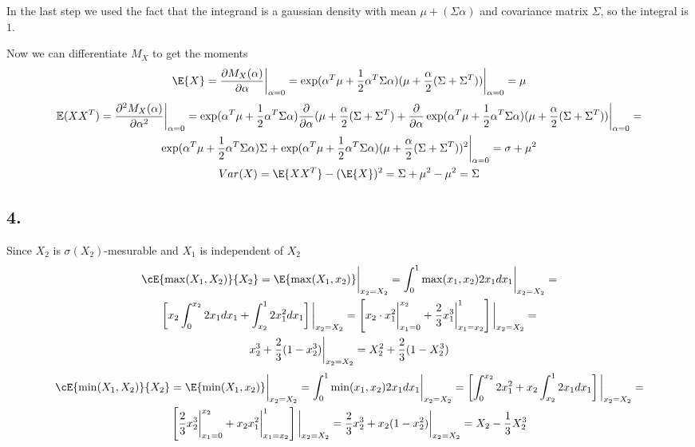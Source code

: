 In the last step we used the fact that the integrand is a gaussian density with mean $\mu+(\Sigma\alpha)$ and covariance matrix $\Sigma$, so the integral is $1$.

Now we can differentiate $M_X$ to get the moments
\begin{gather*}
    \E{X}=\frac{\partial M_X(\alpha)}{\partial \alpha}\bigg \lvert_{\alpha=0} = \exp( \alpha^T\mu +\frac{1}{2}\alpha^T\Sigma\alpha)(\mu+\frac{\alpha}{2}(\Sigma+\Sigma^T))\bigg\lvert_{\alpha=0}=\mu
\end{gather*}
\begin{gather*}
    \mathbb{E}(XX^T)=\frac{\partial^2M_X(\alpha)}{\partial\alpha^2}\bigg\lvert_{\alpha=0} = \exp( \alpha^T\mu +\frac{1}{2}\alpha^T\Sigma\alpha) \frac{\partial}{\partial \alpha}(\mu+\frac{\alpha}{2}(\Sigma+\Sigma^T) + \frac{\partial}{\partial\alpha}\exp( \alpha^T\mu +\frac{1}{2}\alpha^T\Sigma\alpha) (\mu+\frac{\alpha}{2}(\Sigma+\Sigma^T))\bigg \lvert_{\alpha=0}  =\\
    \exp( \alpha^T\mu +\frac{1}{2}\alpha^T\Sigma\alpha) \Sigma + \exp( \alpha^T\mu +\frac{1}{2}\alpha^T\Sigma\alpha)(\mu+\frac{\alpha}{2}(\Sigma+\Sigma^T))^2\bigg \lvert_{\alpha=0} = \sigma + \mu^2 \\
    Var(X) = \E{XX^T}-(\E{X})^2= \Sigma+\mu^2-\mu^2=\Sigma
\end{gather*}

\subsection*{4.} Since $X_2$ is $\sigma(X_2)$-mesurable and $X_1$ is independent of $X_2$
\begin{gather*}
    \cE{\max(X_1,X_2)}{X_2} = \E{\max(X_1,x_2)}\bigg\lvert_{x_2=X_2} = \int_{0}^{1} \max(x_1, x_2)2x_1 dx_1 \bigg\lvert_{x_2=X_2}= \\
    \left[x_2 \int_0^{x_2} 2x_1 dx_1 + \int_{x_2}^1 2x_1^2 dx_1 \right]\bigg\lvert_{x_2=X_2} = \left[ x_2 \cdot x_1^2 \bigg   \lvert_{x_1=0}^{x_2} + \frac{2}{3}x_1^3  \bigg \lvert_{x_1=x_2}^1  \right]  \bigg\lvert_{x_2=X_2} = \\ x_2^3+\frac{2}{3}(1-x_2^3)\bigg\lvert_{x_2=X_2} = X_2^2 + \frac{2}{3}(1-X_2^3)
\end{gather*}
\begin{gather*}
    \cE{\min(X_1,X_2)}{X_2} = \E{\min(X_1,x_2)}\bigg\lvert_{x_2=X_2} = \int_0^1 \min(x_1, x_2) 2x_1 dx_1 \bigg\lvert_{x_2=X_2} = 
    \left [\int_0^{x_2} 2x_1^2 + x_2\int_{x_2}^1 2x_1 dx_1 \right] \bigg\lvert_{x_2=X_2}  = \\
    \left[ \frac{2}{3}x_2^3\bigg\lvert_{x_1=0}^{x_2}+x_2x_1^2 \bigg\lvert_{x_1=x_2}^{1}\right]\bigg\lvert_{x_2=X_2} = \frac{2}{3}x_2^3+x_2(1-x_2^2)\bigg\lvert_{x_2=X_2} = X_2-\frac{1}{3}X_2^3
\end{gather*}
